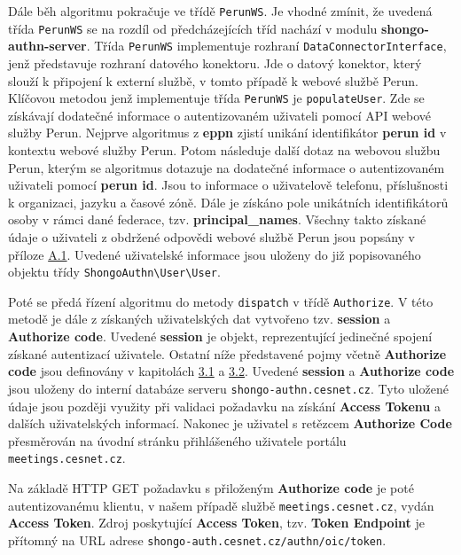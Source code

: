 \documentclass[
  printed, %
  twoside, %
  table,   %
  nolof,     %
  nolot,     %
]{fithesis3}
\begin{document}
\label{sec:responseAction}
Dále běh algoritmu pokračuje ve třídě \texttt{PerunWS}. Je vhodné zmínit, že uvedená třída \texttt{PerunWS} se na rozdíl od předcházejících tříd nachází v modulu \textbf{shongo-authn-server}. Třída \texttt{PerunWS} implementuje rozhraní \texttt{DataConnectorInterface}, jenž představuje rozhraní datového konektoru. Jde o datový konektor, který slouží k připojení k externí službě, v tomto případě k webové službě Perun. Klíčovou metodou jenž implementuje třída \texttt{PerunWS} je \texttt{populateUser}. Zde se získávají dodatečné informace o autentizovaném uživateli pomocí API webové služby Perun. Nejprve algoritmus z \textbf{eppn} zjistí unikání identifikátor \textbf{perun id} v kontextu webové služby Perun. Potom následuje další dotaz na webovou službu Perun, kterým se algoritmus dotazuje na dodatečné informace o autentizovaném uživateli pomocí \textbf{perun id}. Jsou to informace o uživatelově telefonu, příslušnosti k organizaci, jazyku a časové zóně. Dále je získáno pole unikátních identifikátorů osoby v rámci dané federace, tzv. \textbf{principal\_names}. Všechny takto získané údaje o uživateli z obdržené odpovědi webové službě Perun jsou popsány v příloze \hyperref[table:perunws:user]{A.1}. Uvedené uživatelské informace jsou uloženy do již popisovaného objektu třídy \texttt{ShongoAuthn\textbackslash User\textbackslash User}. \par

Poté se předá řízení algoritmu do metody \texttt{dispatch} v třídě \texttt{Authorize}. V této metodě je dále z získaných uživatelských dat vytvořeno tzv. \textbf{session} a \textbf{Authorize code}. Uvedené \textbf{session} je objekt, reprezentující jedinečné spojení získané autentizací uživatele. Ostatní níže představené pojmy včetně \textbf{Authorize code} jsou definovány v kapitolách \hyperref[sec:oauth]{3.1} a \hyperref[sec:oidc]{3.2}. Uvedené \textbf{session} a \textbf{Authorize code} jsou uloženy do interní databáze serveru \texttt{shongo-authn.cesnet.cz}. Tyto uložené údaje jsou později využity při validaci požadavku na získání \textbf{Access Tokenu} a dalších uživatelských informací. Nakonec je uživatel s retězcem \textbf{Authorize Code} přesměrován na úvodní stránku přihlášeného uživatele portálu \texttt{meetings.cesnet.cz}. \par

Na základě HTTP GET požadavku s přiloženým \textbf{Authorize code} je poté autentizovanému klientu, v našem případě službě \texttt{meetings.cesnet.cz}, vydán  \textbf{Access Token}. Zdroj poskytující \textbf{Access Token}, tzv. \textbf{Token Endpoint} je přítomný na URL adrese \texttt{shongo-auth.cesnet.cz/authn/oic/token}. \par 
\end{document}
